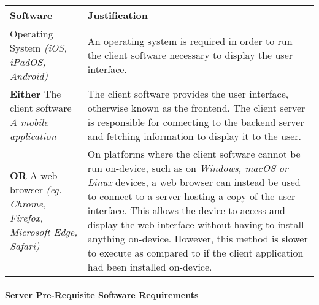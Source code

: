 \documentclass[../../../main.tex]{subfiles}
\begin{document}
\begin{tabular}{ |p{}|p{}| }
    \hline
    \textbf{Software}                                      & \textbf{Justification}                                                                                                                                                                                      \\
    \hline
    Operating System \newline
    \textit{(iOS, iPadOS, Android)}                        &
    An operating system is required in order to run the client software necessary to display the user interface.                                                                                                                                                         \\
    \hline
    \textbf{Either} The client software \newline
    \textit{A mobile application}                          & The client software provides the user interface, otherwise known as the frontend. The client server is responsible for connecting to the backend server and fetching information to display it to the user. \\
    \hline
    \textbf{OR} A web browser \newline
    \textit{(eg. Chrome, Firefox, Microsoft Edge, Safari)} &
    On platforms where the client software cannot be run on-device, such as on \textit{Windows, macOS or Linux} devices, a web browser can instead be used to connect to a server hosting a copy of the user interface. This allows the device to access and display the web interface without having to install anything on-device.
    \newline However, this method is slower to execute as compared to if the client application had been installed on-device.                                                                                                                                            \\
    \hline
\end{tabular}

\paragraph{Server Pre-Requisite Software Requirements}

\paragraph{} %
\end{document}
